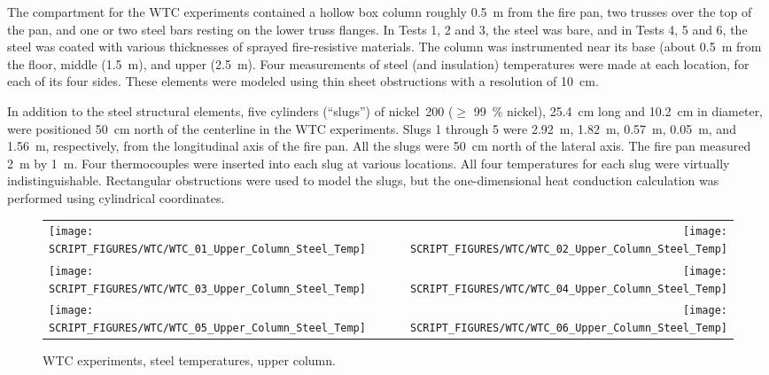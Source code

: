 The compartment for the WTC experiments contained a hollow box column roughly 0.5~m from the fire pan, two trusses over the top of the pan, and one or two steel bars resting on the lower truss flanges. In Tests 1, 2 and 3, the steel was bare, and in Tests 4, 5 and 6, the steel was coated with various thicknesses of sprayed fire-resistive materials. The column was instrumented near its base (about 0.5~m from the floor, middle (1.5~m), and upper (2.5~m). Four measurements of steel (and insulation) temperatures were made at each location, for each of its four sides. These elements were modeled using thin sheet obstructions with a resolution of 10~cm.

In addition to the steel structural elements, five cylinders (``slugs'') of nickel~200 ($\ge$ 99~\% nickel), 25.4~cm long and 10.2~cm in diameter, were positioned 50~cm north of the centerline in the WTC experiments. Slugs 1 through 5 were 2.92~m, 1.82~m, 0.57~m, 0.05~m, and 1.56~m, respectively, from the longitudinal axis of the fire pan. All the slugs were 50~cm north of the lateral axis. The fire pan measured 2~m by 1~m. Four thermocouples were inserted into each slug at various locations. All four temperatures for each slug were virtually indistinguishable. Rectangular obstructions were used to model the slugs, but the one-dimensional heat conduction calculation was performed using cylindrical coordinates.

\newpage

\begin{figure}[p]
\begin{tabular*}{\textwidth}{l@{\extracolsep{\fill}}r}
\texttt{[image: SCRIPT\_FIGURES/WTC/WTC\_01\_Upper\_Column\_Steel\_Temp]} &
\texttt{[image: SCRIPT\_FIGURES/WTC/WTC\_02\_Upper\_Column\_Steel\_Temp]} \\
\texttt{[image: SCRIPT\_FIGURES/WTC/WTC\_03\_Upper\_Column\_Steel\_Temp]} &
\texttt{[image: SCRIPT\_FIGURES/WTC/WTC\_04\_Upper\_Column\_Steel\_Temp]} \\
\texttt{[image: SCRIPT\_FIGURES/WTC/WTC\_05\_Upper\_Column\_Steel\_Temp]} &
\texttt{[image: SCRIPT\_FIGURES/WTC/WTC\_06\_Upper\_Column\_Steel\_Temp]}
\end{tabular*}
\caption[WTC experiments, steel temperatures, upper column]{WTC experiments, steel temperatures, upper column.}
\label{NIST_WTC_Upper_Column_Steel}
\end{figure}


